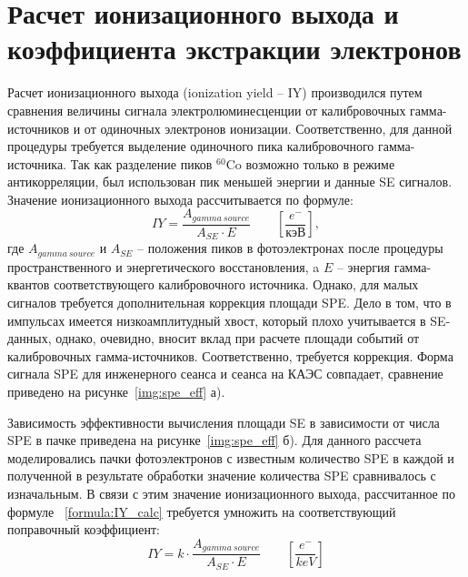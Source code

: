 \section{Расчет ионизационного выхода и коэффициента экстракции электронов}
\label{sect3_5}
Расчет ионизационного выхода (ionization yield -- IY) производился путем сравнения величины сигнала электролюминесценции от калибровочных гамма-источников и от одиночных электронов ионизации. Соответственно, для данной процедуры требуется выделение одиночного пика калибровочного гамма-источника. Так как разделение пиков $^{60}$Co возможно только в режиме антикорреляции, был использован пик меньшей энергии и данные SE сигналов. Значение ионизационного выхода рассчитывается по формуле:
\begin{equation}
    IY = \frac{A_{gamma\:source}}{A_{SE}\cdot E} \qquad \left[ \frac{e^-}{\text{кэВ}} \right]
    \label{formula:IY_calc},
\end{equation} где $A_{gamma\:source}$ и $A_{SE}$ -- положения пиков в фотоэлектронах после процедуры пространственного и энергетического восстановления, a $E$ -- энергия гамма-квантов соответствующего калибровочного источника. Однако, для малых сигналов требуется дополнительная коррекция площади SPE.
Дело в том, что в импульсах имеется низкоамплитудный хвост, который плохо учитывается в SE-данных, однако, очевидно, вносит вклад при расчете площади событий от калибровочных гамма-источников. Соответственно, требуется коррекция. Форма сигнала SPE для инженерного сеанса и сеанса на КАЭС совпадает, сравнение приведено на рисунке~\ref{img:spe_eff} а).

 Зависимость эффективности вычисления площади SE в зависимости от числа SPE в пачке приведена на рисунке~\ref{img:spe_eff} б). Для данного рассчета моделировались пачки фотоэлектронов с известным количество SPE в каждой и полученной в результате обработки значение количества SPE сравнивалось с изначальным. В связи с этим значение ионизационного выхода, рассчитанное по формуле ~\ref{formula:IY_calc} требуется умножить на соответствующий поправочный коэффициент:
\begin{equation}
    IY = k\cdot  \frac{A_{gamma\:source}}{A_{SE}\cdot E} \qquad \left[ \frac{e^-}{keV} \right]
    \label{formula:IY_calc_corr}
\end{equation}

